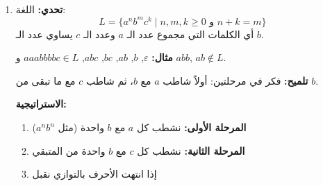 \documentclass[14pt]{extarticle}
\begin{document}
\begin{enumerate}[itemsep=4em]
\begin{enumerate}[itemsep=4em]
\begin{enumerate}[itemsep=4em]
\begin{enumerate}[itemsep=4em]
\begin{enumerate}[itemsep=2em]
\begin{boxSolution}
\textbf{تصحيح:} نحتاج إضافة انتقال من $q_0$ على $b$ للمرور عليها:
أضف: $q_0 \xrightarrow{b \mid b, R} q_0$ ثم تابع:
\begin{align*}
q_0 \quad &\vdash \, X \, \underline{b} \, b \, Z \, \triangle \quad \text{(لا $a$ متبقية، ننظر في $q_0$)}\\
\end{align*}
في الواقع، بعد $q_0$ يرى الآلة $b$ بعد $X$، فنحتاج أن $q_0$ يعبر الـ $b$. أو الأبسط: من $q_0$ إذا رأى $Z$، انتقل لـ $q_4$ (التحقق من النهاية). وإذا رأى $b$ بعد الـ $X$، فهذا يعني لا يوجد $a$، انتقل لمسار التحقق.

الحل الأنظف يُضيف: $q_0 \xrightarrow{b \mid b, R} q_3'$ حيث $q_3'$ تمر على الـ $b$ و $Z$ وتتحقق من النهاية.
\end{boxSolution}
\clearpage
\fi

\item \textbf{تحدي:} اللغة:
\[ L = \{ a^n b^m c^k \mid n, m, k \geq 0 \text{ و } n + k = m \} \]
أي الكلمات التي مجموع عدد الـ $a$ وعدد الـ $c$ يساوي عدد الـ $b$.

\textbf{مثال:} $\varepsilon$, $b$, $ab$, $bc$, $abc$, $aaabbbbc \in L$ \quad و \quad $abb$, $ab \notin L$.

\textbf{تلميح:} فكر في مرحلتين: أولاً شاطب $a$ مع $b$، ثم شاطب $c$ مع ما تبقى من $b$.

\ifwithsols
\begin{boxSolution}
\textbf{الاستراتيجية:}
\begin{enumerate}
    \item \textbf{المرحلة الأولى:} نشطب كل $a$ مع $b$ واحدة (مثل $a^n b^n$)
    \item \textbf{المرحلة الثانية:} نشطب كل $c$ مع $b$ واحدة من المتبقي
    \item إذا انتهت الأحرف بالتوازي نقبل
\end{enumerate}

\begin{center}
\end{center}
\end{boxSolution}
\end{enumerate}
\end{enumerate}
\end{enumerate}
\end{enumerate}
\end{enumerate}
\end{document}
